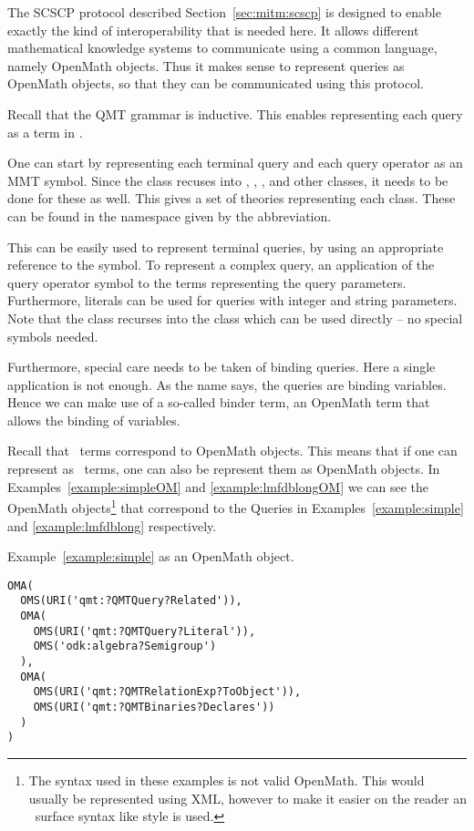 The SCSCP protocol described Section~\ref{sec:mitm:scscp} is designed to enable exactly the kind of interoperability that is needed here. 
It allows different mathematical knowledge systems to communicate using a common language, namely OpenMath objects. 
Thus it makes sense to represent queries as OpenMath objects, so that they can be communicated using this protocol. 

Recall that the QMT grammar is inductive. 
This enables representing each query as a term in \mmt. 

One can start by representing each terminal query and each query operator as an MMT symbol. 
Since the  class recuses into , , ,  and other classes, it needs to be done for these as well. 
This gives a set of theories representing each class. 
These can be found in the namespace given by the  abbreviation. 

This can be easily used to represent terminal queries, by using an appropriate reference to the symbol.
To represent a complex query, an application of the query operator symbol to the terms representing the query parameters. 
Furthermore, literals can be used for queries with integer and string parameters. 
Note that the  class recurses into the  class which can be used directly -- no special symbols needed. 

Furthermore, special care needs to be taken of binding queries. 
Here a single application is not enough. 
As the name says, the queries are binding variables. 
Hence we can make use of a so-called binder term, an OpenMath term that allows the binding of variables. 

Recall that \mmt\ terms correspond to OpenMath objects. 
This means that if one can represent  as \mmt\ terms, one can also be represent them as OpenMath objects. 
In Examples~\ref{example:simpleOM} and \ref{example:lmfdblongOM} we can see the OpenMath objects\footnote{
  The syntax used in these examples is not valid OpenMath. 
  This would usually be represented using XML, however to make it easier on the reader an \mmt\ surface syntax like style is used. 
} that correspond to the Queries in
Examples~\ref{example:simple} and \ref{example:lmfdblong} respectively. 

\begin{example}\label{example:simpleOM}
  Example~\ref{example:simple} as an OpenMath object. 
  \begin{lstlisting}[language=qmt]
OMA(
  OMS(URI('qmt:?QMTQuery?Related')), 
  OMA(
    OMS(URI('qmt:?QMTQuery?Literal')), 
    OMS('odk:algebra?Semigroup')
  ),
  OMA(
    OMS(URI('qmt:?QMTRelationExp?ToObject')), 
    OMS(URI('qmt:?QMTBinaries?Declares'))
  )
)
  \end{lstlisting}
\end{example}

